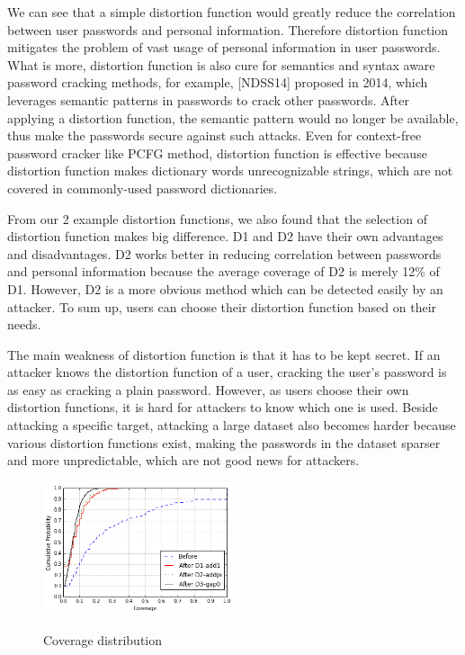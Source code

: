 \documentclass{sig-alternate}
\begin{document}
We can see that a simple distortion function would greatly reduce the correlation between user passwords and personal information. Therefore distortion function mitigates the problem of vast usage of personal information in user passwords. What is more, distortion function is also cure for semantics and syntax aware password cracking methods, for example, [NDSS14] proposed in 2014, which leverages semantic patterns in passwords to crack other passwords. After applying a distortion function, the semantic pattern would no longer be available, thus make the passwords secure against such attacks. Even for context-free password cracker like PCFG method, distortion function is effective because distortion function makes dictionary words unrecognizable strings, which are not covered in commonly-used password dictionaries. 

From our 2 example distortion functions, we also found that the selection of distortion function makes big difference. D1 and D2 have their own advantages and disadvantages. D2 works better in reducing correlation between passwords and personal information because the average coverage of D2 is merely 12\% of D1. However, D2 is a more obvious method which can be detected easily by an attacker. To sum up, users can choose their distortion function based on their needs. 

The main weakness of distortion function is that it has to be kept secret. If an attacker knows the distortion function of a user, cracking the user's password is as easy as cracking a plain password. However, as users choose their own distortion functions, it is hard for attackers to know which one is used. Beside attacking a specific target, attacking a large dataset also becomes harder because various distortion functions exist, making the passwords in the dataset sparser and more unpredictable, which are not good news for attackers.
 
 \begin{figure}[h!]
\centering
  \caption{Coverage distribution}{}
  \label{f4}
  \centering
    \includegraphics[width=0.5\textwidth]{fig/dist2}
\end{figure}
\end{document}
